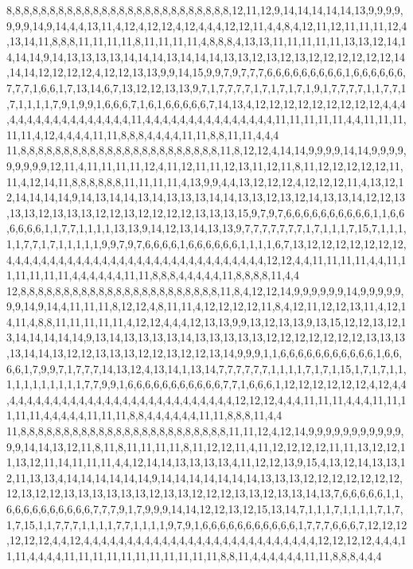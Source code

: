 8,8,8,8,8,8,8,8,8,8,8,8,8,8,8,8,8,8,8,8,8,8,8,8,8,8,12,11,12,9,14,14,14,14,14,13,9,9,9,9,9,9,9,14,9,14,4,4,13,11,4,12,4,12,12,4,12,4,4,4,12,12,11,4,4,8,4,12,11,12,11,11,11,12,4,13,14,11,8,8,8,11,11,11,11,8,11,11,11,11,4,8,8,8,4,13,13,11,11,11,11,11,13,13,12,14,14,14,14,9,14,13,13,13,13,14,14,14,13,14,14,14,13,13,12,13,12,13,12,12,12,12,12,12,14,14,14,12,12,12,12,4,12,12,13,13,9,9,14,15,9,9,7,9,7,7,7,6,6,6,6,6,6,6,6,6,1,6,6,6,6,6,6,7,7,7,1,6,6,1,7,13,14,6,7,13,12,12,13,13,9,7,1,7,7,7,7,1,7,1,7,1,7,1,9,1,7,7,7,7,1,1,7,7,1,7,1,1,1,1,7,9,1,9,9,1,6,6,6,7,1,6,1,6,6,6,6,6,7,14,13,4,12,12,12,12,12,12,12,12,12,4,4,4,4,4,4,4,4,4,4,4,4,4,4,4,4,4,11,4,4,4,4,4,4,4,4,4,4,4,4,4,4,4,11,11,11,11,11,4,4,11,11,11,11,11,4,12,4,4,4,4,11,11,8,8,8,4,4,4,4,11,11,8,8,11,11,4,4,4
11,8,8,8,8,8,8,8,8,8,8,8,8,8,8,8,8,8,8,8,8,8,8,8,11,8,12,12,4,14,14,9,9,9,9,14,14,9,9,9,9,9,9,9,9,9,12,11,4,11,11,11,11,12,4,11,12,11,11,12,13,11,12,11,8,11,12,12,12,12,12,11,11,4,12,14,11,8,8,8,8,8,8,11,11,11,11,4,13,9,9,4,4,13,12,12,12,4,12,12,12,11,4,13,12,12,14,14,14,14,9,14,13,14,14,13,14,13,13,13,14,14,13,13,12,13,12,14,13,13,14,12,12,13,13,13,12,13,13,13,12,12,13,12,12,12,12,13,13,13,15,9,7,9,7,6,6,6,6,6,6,6,6,6,6,1,1,6,6,6,6,6,6,1,1,7,7,1,1,1,1,13,13,9,14,12,13,14,13,13,9,7,7,7,7,7,7,7,1,7,1,1,1,7,15,7,1,1,1,1,1,7,7,1,7,1,1,1,1,1,9,9,7,9,7,6,6,6,6,1,6,6,6,6,6,6,1,1,1,1,6,7,13,12,12,12,12,12,12,12,4,4,4,4,4,4,4,4,4,4,4,4,4,4,4,4,4,4,4,4,4,4,4,4,4,4,4,4,4,4,12,12,4,4,11,11,11,11,4,4,11,11,11,11,11,11,4,4,4,4,4,4,11,11,8,8,8,4,4,4,4,4,11,8,8,8,8,11,4,4
12,8,8,8,8,8,8,8,8,8,8,8,8,8,8,8,8,8,8,8,8,8,8,8,11,8,4,12,12,14,9,9,9,9,9,9,14,9,9,9,9,9,9,9,14,9,14,4,11,11,11,8,12,12,4,8,11,11,4,12,12,12,12,11,8,4,12,11,12,12,13,11,4,12,14,11,4,8,8,11,11,11,11,11,4,12,12,4,4,4,12,13,13,9,9,13,12,13,13,9,13,15,12,12,13,12,13,14,14,14,14,14,9,13,14,13,13,13,13,14,13,13,13,13,13,12,12,12,12,12,12,12,13,13,13,13,14,14,13,12,12,13,13,13,12,12,13,12,12,13,14,9,9,9,1,1,6,6,6,6,6,6,6,6,6,6,6,1,6,6,6,6,1,7,9,9,7,1,7,7,7,14,13,12,4,13,14,1,13,14,7,7,7,7,7,7,1,1,1,1,7,1,7,1,15,1,7,1,7,1,1,1,1,1,1,1,1,1,1,1,7,7,9,9,1,6,6,6,6,6,6,6,6,6,6,6,7,7,1,6,6,6,1,12,12,12,12,12,12,4,12,4,4,4,4,4,4,4,4,4,4,4,4,4,4,4,4,4,4,4,4,4,4,4,4,4,4,4,4,12,12,12,4,4,4,11,11,11,4,4,4,11,11,11,11,11,4,4,4,4,4,11,11,11,8,8,4,4,4,4,4,4,11,11,8,8,8,11,4,4
11,8,8,8,8,8,8,8,8,8,8,8,8,8,8,8,8,8,8,8,8,8,8,8,8,11,11,12,4,12,14,9,9,9,9,9,9,9,9,9,9,9,9,9,14,14,13,12,11,8,11,8,11,11,11,11,8,11,12,12,11,4,11,12,12,12,12,11,11,13,12,12,11,13,12,11,14,11,11,11,4,4,12,14,14,13,13,13,13,4,11,12,12,13,9,15,4,13,12,14,13,13,12,11,13,13,4,14,14,14,14,14,14,9,14,14,14,14,14,14,14,13,13,13,12,12,12,12,12,12,12,12,13,12,12,13,13,13,13,13,13,12,13,13,12,12,12,13,13,12,13,13,14,13,7,6,6,6,6,6,1,1,6,6,6,6,6,6,6,6,6,6,7,7,7,9,1,7,9,9,9,14,14,12,12,13,12,15,13,14,7,1,1,1,7,1,1,1,1,7,1,7,1,7,15,1,1,7,7,7,1,1,1,1,7,7,1,1,1,1,9,7,9,1,6,6,6,6,6,6,6,6,6,6,6,1,7,7,7,6,6,6,7,12,12,12,12,12,12,4,4,12,4,4,4,4,4,4,4,4,4,4,4,4,4,4,4,4,4,4,4,4,4,4,4,4,4,4,4,12,12,12,12,4,4,4,11,11,4,4,4,4,11,11,11,11,11,11,11,11,11,11,11,8,8,11,4,4,4,4,4,4,11,11,8,8,8,4,4,4
